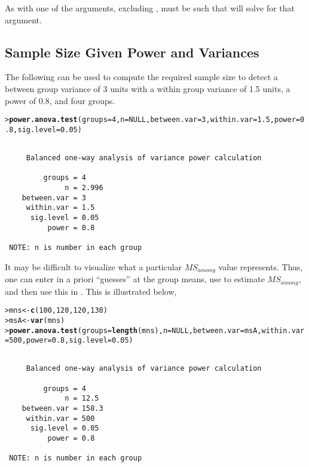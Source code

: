 \documentclass{article}\usepackage{graphicx, color}
\makeatletter
\newcommand{\hlfunctioncall}[1]{\textcolor[rgb]{0.501960784313725,0,0.329411764705882}{\textbf{#1}}}%
\newenvironment{kframe}{%
 \def\at@end@of@kframe{}%
 \ifinner\ifhmode%
  \def\at@end@of@kframe{\end{minipage}}%
  \begin{minipage}{\columnwidth}%
 \fi\fi%
 \def\FrameCommand##1{\hskip\@totalleftmargin \hskip-\fboxsep
 \colorbox{shadecolor}{##1}\hskip-\fboxsep
     \hskip-\linewidth \hskip-\@totalleftmargin \hskip\columnwidth}%
 \MakeFramed {\advance\hsize-\width
   \@totalleftmargin\z@ \linewidth\hsize
   \@setminipage}}%
 {\par\unskip\endMakeFramed%
 \at@end@of@kframe}
\newenvironment{knitrout}{}{} %
\makeatother
\begin{document}
As with  one of the arguments, excluding , must be  such that  will solve for that argument.

\subsection{Sample Size Given Power and Variances}
The following can be used to compute the required sample size to detect a between group variance of 3 units with a within group variance of 1.5 units, a power of 0.8, and four groups.
\begin{knitrout}
\color{fgcolor}\begin{kframe}
\begin{alltt}
> \hlfunctioncall{power.anova.test}(groups=4,n=NULL,between.var=3,within.var=1.5,power=0.8,sig.level=0.05)
\end{alltt}
\begin{verbatim}

     Balanced one-way analysis of variance power calculation 

         groups = 4
              n = 2.996
    between.var = 3
     within.var = 1.5
      sig.level = 0.05
          power = 0.8

 NOTE: n is number in each group 
\end{verbatim}
\end{kframe}
\end{knitrout}


It may be difficult to visualize what a particular $MS_{among}$ value represents.  Thus, one can enter in a priori ``guesses'' at the group means, use  to estimate $MS_{among}$, and then use this in . This is illustrated below,
\begin{knitrout}
\color{fgcolor}\begin{kframe}
\begin{alltt}
> mns <- \hlfunctioncall{c}(100,120,120,130)
> msA <- \hlfunctioncall{var}(mns)
> \hlfunctioncall{power.anova.test}(groups=\hlfunctioncall{length}(mns),n=NULL,between.var=msA,within.var=500,power=0.8,sig.level=0.05)
\end{alltt}
\begin{verbatim}

     Balanced one-way analysis of variance power calculation 

         groups = 4
              n = 12.5
    between.var = 158.3
     within.var = 500
      sig.level = 0.05
          power = 0.8

 NOTE: n is number in each group 
\end{verbatim}
\end{kframe}
\end{knitrout}
\end{document}
